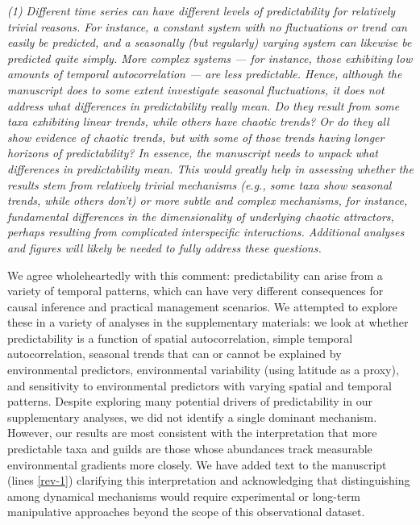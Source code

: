 \documentclass[11pt]{article}
\begin{document}
\textit{(1) Different time series can have different levels of predictability for relatively trivial reasons. For instance, a constant system with no fluctuations or trend can easily be predicted, and a seasonally (but regularly) varying system can likewise be predicted quite simply. More complex systems --- for instance, those exhibiting low amounts of temporal autocorrelation --- are less predictable. Hence, although the manuscript does to some extent investigate seasonal fluctuations, it does not address what differences in predictability really mean. Do they result from some taxa exhibiting linear trends, while others have chaotic trends? Or do they all show evidence of chaotic trends, but with some of those trends having longer horizons of predictability? In essence, the manuscript needs to unpack what differences in predictability mean. This would greatly help in assessing whether the results stem from relatively trivial mechanisms (e.g., some taxa show seasonal trends, while others don't) or more subtle and complex mechanisms, for instance, fundamental differences in the dimensionality of underlying chaotic attractors, perhaps resulting from complicated interspecific interactions. Additional analyses and figures will likely be needed to fully address these questions.}

We agree wholeheartedly with this comment: predictability can arise from a variety of temporal patterns, which can have very different consequences for causal inference and practical management scenarios. We attempted to explore these in a variety of analyses in the supplementary materials: we look at whether predictability is a function of spatial autocorrelation, simple temporal autocorrelation, seasonal trends that can or cannot be explained by environmental predictors, environmental variability (using latitude as a proxy), and sensitivity to environmental predictors with varying spatial and temporal patterns. Despite exploring many potential drivers of predictability in our supplementary analyses, we did not identify a single dominant mechanism. However, our results are most consistent with the interpretation that more predictable taxa and guilds are those whose abundances track measurable environmental gradients more closely. We have added text to the manuscript (lines \ref{rev-1}) clarifying this interpretation and acknowledging that distinguishing among dynamical mechanisms would require experimental or long-term manipulative approaches beyond the scope of this observational dataset.

\bigskip
\end{document}
